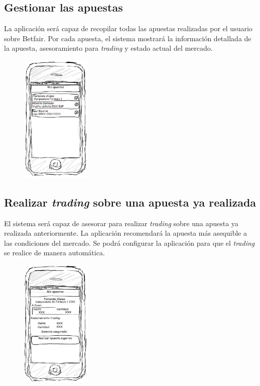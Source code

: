 \subsection{Gestionar las apuestas}
La aplicación será capaz de recopilar todas las apuestas realizadas por el usuario sobre Betfair. Por cada apuesta, el sistema mostrará la información detallada de la apuesta, asesoramiento para \emph{trading} y estado actual del mercado.
\begin{figure}[H]
    \centering
       \includegraphics[width=0.3\textwidth]{./images/req_misapuestas.png}
   \label{fig:Requisito gestionar mis apuestas}
\end{figure}
\subsection{Realizar \emph{trading} sobre una apuesta ya realizada}
El sistema será capaz de asesorar para realizar \emph{trading} sobre una apuesta ya realizada anteriormente. La aplicación recomendará la apuesta más asequible a las condiciones del mercado. Se  podrá configurar la aplicación para que el \emph{trading} se realice de manera automática.
\begin{figure}[H]
    \centering
       \includegraphics[width=0.3\textwidth]{./images/req_trading.png}
   \label{fig:Requisito trading}
\end{figure}

